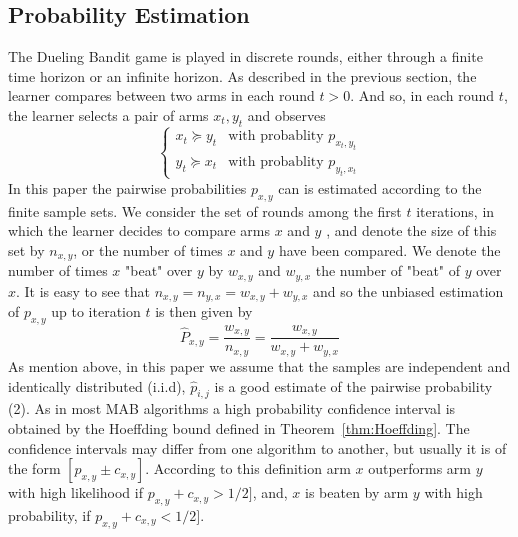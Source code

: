 \documentclass{llncs}
\begin{document}
	\subsection{Probability Estimation}		 
		The Dueling Bandit game is played in discrete rounds, either through a finite time horizon or an infinite horizon. 
		 As described in the previous section, the learner compares between two arms in each round $t > 0$. 
		 And so, in each round $t$, the learner selects a pair of arms $x_t,y_t$ and observes
	\begin{equation}
		\begin{cases}
    		x_t \succeq y_t & \text{with probablity } p_{x_t,y_t} 
       	\\
    		y_t \succeq x_t & \text{with probablity } p_{y_t,x_t}
	\end{cases}
	\end{equation}		
	In this paper the pairwise probabilities $p_{x,y}$ can is estimated according to the finite sample sets.
	We consider the set of rounds among the first $t$ iterations, in which the learner decides to compare arms $x$ and $y$ , and denote the size of this set by $n_{x,y}$, or the number of times $x$ and $y$ have been compared.  
	We denote the number of times $x$ "beat" over $y$ by $w_{x,y}$ and $w_{y,x}$ the number of "beat" of $y$ over $x$.
	It is easy to see that $n_{x,y} = n_{y,x} = w_{x,y}+w_{y,x}$ and so the unbiased estimation of $p_{x,y}$ up to iteration $t$ is then given by
	\begin{equation}\label{eq:est_pxy}
		\hat{P}_{x, y} = \frac{w_{x,y}}{n_{x,y}} = 
		\frac{w_{x,y}}{w_{x,y}+w_{y,x}}
	\end{equation}	 
	As mention above, in this paper we assume that the samples are independent and identically distributed (i.i.d), $\hat{p}_{i,j}$ is a good estimate of the pairwise probability (2). 
	As in most MAB algorithms a high probability confidence interval is obtained by the Hoeffding bound defined in Theorem~\ref{thm:Hoeffding}. 
	The confidence intervals may differ from one algorithm to another, but usually it is of the form $[p_{x,y} \pm c_{x,y} ]$. 
	According to this definition arm $x$ outperforms arm $y$ with high likelihood if $p_{x,y} + c_{x,y} > 1/2]$, and, $x$ is beaten by arm $y$ with high probability, if $p_{x,y} + c_{x,y} < 1/2]$.
\end{document}
